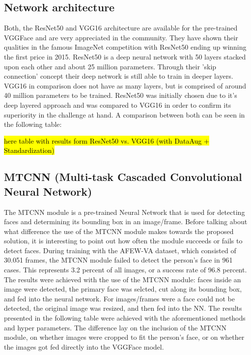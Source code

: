 \subsection{Network architecture}
Both, the ResNet50 and VGG16 architecture are available for the pre-trained VGGFace and are very appreciated in the community. They have shown their qualities in the famous ImageNet competition with ResNet50 ending up winning the first price in 2015. ResNet50 is a deep neural network with 50 layers stacked upon each other and about 25 million parameters. Through their 'skip connection' concept their deep network is still able to train in deeper layers. VGG16 in comparison does not have as many layers, but is comprised of around 40 million parameters to be trained.
\newline\newline
ResNet50 was initially chosen due to it's deep layered approach and was compared to VGG16 in order to confirm its superiority in the challenge at hand. A comparison between both can be seen in the following table:

\hl{here table with results form ResNet50 vs. VGG16 (with DataAug + Standardization)}


\subsection{MTCNN (Multi-task Cascaded Convolutional Neural Network)}
The MTCNN module is a pre-trained Neural Network that is used for detecting faces and determining its bounding box in an image/frame. Before talking about what difference the use of the MTCNN module makes towards the proposed solution, it is interesting to point out how often the module succeeds or fails to detect faces.
\newline\newline
During training with the AFEW-VA dataset, which consisted of 30.051 frames, the MTCNN module failed to detect the person's face in 961 cases. This represents 3.2 percent of all images, or a success rate of 96.8 percent.
\newline\newline
The results were achieved with the use of the MTCNN module: faces inside an image were detected, the primary face was selcted, cut along its bounding box, and fed into the neural network. For images/frames were a face could not be detected, the original image was resized, and then fed into the NN.
\newline\newline
The results presented in the following table were achieved with the aforementioned methods and hyper parameters. The difference lay on the inclusion of the MTCNN module, on whether images were cropped to fit the person's face, or on whether the images got fed directly into the VGGFace model.


